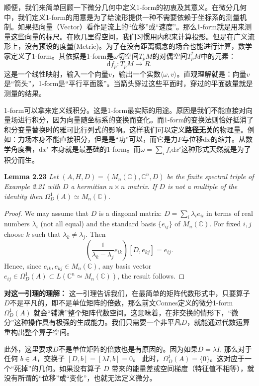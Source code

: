 顺便，我们来简单回顾一下微分几何中定义1-form的初衷及其意义。在微分几何中，我们定义1-form的用意是为了给流形提供一种不需要依赖于坐标系的测量机制。如果把向量（Vector）看作是流上的``位移''或``速度''。那么1-form就是用来测量这些向量的标尺。在欧几里得空间，我们习惯用内积来计算投影。但是在广义流形上，没有预设的度量(Metric)。为了在没有距离概念的场合也能进行计算，数学家定义了1-form。其依据是1-form是$\omega$切空间$T_pM$的对偶空间$T_p^{*}M$中的元素：
 \[
 \text{d}f_p:T_pM\rightarrow R.
 \]
这是一个线性映射，输入一个向量$v$，输出一个实数$\langle\omega,v\rangle$。直观理解就是：向量$v$是``箭头''，1-form是``平行平面簇''。当箭头穿过这些平面时，穿过的平面数量就是测量的结果。

1-form可以拿来定义线积分。这是1-form最实际的用途。原因是我们不能直接对向量场进行积分，因为向量随坐标系的变换而变化。而1-form的变换法则恰好抵消了积分变量替换时的雅可比行列式的影响。这样我们可以定义\textbf{路径无关}的物理量。例如：力场本身不能直接积分，但是是``功''可以，而它是力$F$与位移$\text{d}x$的缩并。从数学角度看，$\text{d}x^i$ 本身就是最基础的1-form。而$\omega=\sum_if_i\text{d}x^i$这种形式天然就是为了积分而生。

\textbf{Lemma 2.23} \textit{Let $(A, H, D)=(M_n(\mathbb{C}),\mathbb{C}^n, D)$ be the finite spectral triple of Example 2.21 with $D$ a hermitian $n\times n$ matrix. If $D$ is not a multiple of the identity then $\Omega_D^1(A)\simeq M_n(\mathbb{C})$.} 
\begin{proof}
    We may assume that $D$ is a diagonal matrix: $D=\sum_i\lambda_ie_{ii}$ in terms of real numbers $\lambda_i$ (not all equal) and the standard basis $\{e_{ij}\}$ of $M_n(\mathbb{C})$. For fixed $i, j$ choose $k$ such that $\lambda_k\neq \lambda_j$. Then
    \[
    \left(\frac{1}{\lambda_k-\lambda_j}e_{ik}\right)[D,e_{kj}]=e_{ij}.
    \]
    Hence, since $e_{ik}, e_{kj}\in M_n(\mathbb{C})$, any basis vector $e_{ij}\in\Omega_D^1(A)\subset L(\mathbb{C}^n\simeq M_n(\mathbb{C}))$, the result follows.
\end{proof}
\textbf{对这一引理的理解：} 这一引理告诉我们，在最简单的矩阵代数形式中，只要算子$D$不是平凡的，即不是单位矩阵的倍数，那么前文Connes定义的微分1-form $\Omega_D^1(A)$ 就会``铺满''整个矩阵代数空间。这意味着，在非交换的情形下，``微分''这种操作具有极强的生成能力。我们只需要一个非平凡$D$，就能通过代数运算重构出整个算子空间。

此外，这里要求$D$不是单位矩阵的倍数也是有原因的。因为如果$D=\lambda I$, 那么对于任何 $b \in A$，交换子 $[D, b] = [\lambda I, b] = 0$。 此时，$\Omega_D^1(A) = \{0\}$。这对应于一个“死掉”的几何。如果没有算子 $D$ 带来的能量差或空间梯度（特征值不相等），就没有所谓的“位移”或“变化”，也就无法定义微分。

